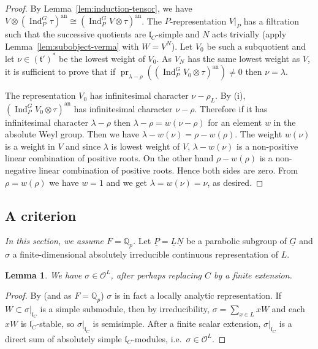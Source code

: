 \documentclass[a4paper]{amsart}
\numberwithin{equation}{section}
\newtheorem{lem}[thm]{Lemma}
\theoremstyle{remark}
\theoremstyle{definition}
\DeclareMathOperator{\Ind}{Ind}
\DeclareMathOperator{\pr}{pr}
\newcommand{\Q}{\mathbb{Q}}
\newcommand{\alggrp}[1]{\underline{#1}}
\newcommand{\an}{\mathrm{an}}
\renewcommand{\simeq}{\cong}
\begin{document}
\begin{proof}
By Lemma~\ref{lem:induction-tensor}, we have $V\otimes (\Ind_{P}^{G}\tau)^{\an}\simeq (\Ind_{P}^{G} V\otimes \tau)^{\an}$.
The $P$-representation $V|_P$ has a filtration such that the successive quotients are $\mathfrak l_C$-simple and $N$ acts trivially (apply Lemma~\ref{lem:subobject-verma} with $W = V^N$).
Let $V_0$ be such a subquotient and let $\nu\in (\mathfrak{t}')^{*}$ be the lowest weight of $V_0$.
As $V_N$ has the same lowest weight as $V$, it is sufficient to prove that if $\pr_{\lambda-\rho}((\Ind_{P}^{G} V_0\otimes \tau)^{\an})\ne 0$ then $\nu = \lambda$.

The representation $V_0$ has infinitesimal character $\nu - \rho_{L}$.
By (i), $(\Ind_{P}^{G} V_0\otimes \tau)^{\an}$ has infinitesimal character $\nu - \rho$.
Therefore if it has infinitesimal character $\lambda - \rho$ then $\lambda - \rho = w(\nu - \rho)$ for an element $w$ in the absolute Weyl group.
Then we have $\lambda - w(\nu) = \rho - w(\rho)$.
The weight $w(\nu)$ is a weight in $V$ and since $\lambda$ is lowest weight of $V$, $\lambda - w(\nu)$ is a non-positive linear combination of positive roots.
On the other hand $\rho - w(\rho)$ is a non-negative linear combination of positive roots.
Hence both sides are zero.
From $\rho = w(\rho)$ we have $w = 1$ and we get $\lambda = w(\nu) = \nu$, as desired.
\end{proof}


\subsection{A criterion}
\label{subsec:A criterion}
\emph{In this section, we assume $F = \Q_{p}$.}
Let $\alggrp{P} = \alggrp{L}\alggrp{N}$ be a parabolic subgroup of $\alggrp{G}$ and $\sigma$ a finite-dimensional absolutely irreducible continuous representation of $L$.

\begin{lem}\label{lem:cts-rep}
We have $\sigma \in \mathcal{O}^{L}$, after perhaps replacing $C$ by a finite extension.
\end{lem}
\begin{proof}
  By \cite[\S V.9]{MR1176100} 
  (and as $F = \Q_{p}$)
  $\sigma$ is in fact a locally analytic representation. If $W \subset \sigma|_{\mathfrak{l}_{C}}$ is a simple submodule, then
  by irreducibility, $\sigma = \sum_{x \in L} xW$ and each $xW$ is $\mathfrak{l}_{C}$-stable, so $\sigma|_{\mathfrak{l}_{C}}$ is semisimple. After
  a finite scalar extension, $\sigma|_{\mathfrak{l}_{C}}$ is a direct sum of absolutely simple $\mathfrak{l}_{C}$-modules, i.e.\ $\sigma \in \mathcal{O}^{L}$.
\end{proof}
\end{document}
